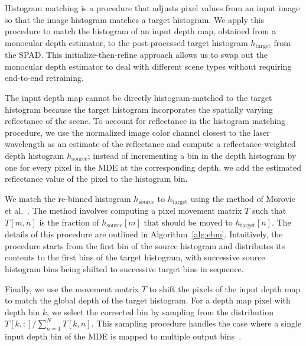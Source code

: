 Histogram matching is a procedure that adjusts pixel values from an input image
so that the image histogram matches a target histogram. We apply this procedure
to match the histogram of an input depth map, obtained from a monocular depth estimator, to the
post-processed target histogram $h_\text{target}$ from the SPAD. This
initialize-then-refine approach allows us to swap out the monocular depth
estimator to deal with different scene types without requiring end-to-end retraining.

The input depth map cannot be directly histogram-matched to the target histogram
because the target histogram incorporates the spatially varying reflectance of
the scene. To account for reflectance in the histogram matching procedure,
we use the normalized image color channel closest to the laser wavelength as an
estimate of the reflectance and compute a reflectance-weighted depth histogram
$h_\text{source}$;
instead of incrementing a bin in the depth histogram by one for every pixel in the MDE
at the corresponding depth, we add the estimated reflectance value of the pixel
to the histogram bin. 

We match the re-binned histogram $h_\text{source}$ to $h_\text{target}$ using the method of
Morovic et al.~\cite{Morovic2002}. The method involves computing a pixel movement
matrix $T$ such that $T[m, n]$ is the fraction of $h_\text{source}[m]$ that should be
moved to $h_\text{target}[n]$. The details of this procedure are outlined in
Algorithm~\ref{alg:ehm}. Intuitively, the procedure starts from the first bin of the
source histogram and distributes its contents to the first bins of the target
histogram, with successive source histogram bins being shifted to successive
target bins in sequence.

Finally, we use the movement matrix $T$ to shift the pixels of the input depth map
to match the global depth of the target histogram. For a depth map pixel with
depth bin $k$, we select the corrected bin by sampling from the distribution $T[k,
:]/\sum_{n=1}^NT[k,n]$. This sampling procedure handles the
case where a single input depth bin of the MDE is mapped to
multiple output bins~\cite{Morovic2002}.


%




